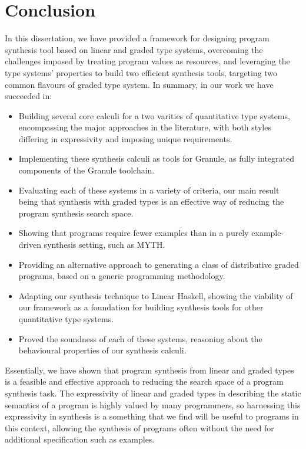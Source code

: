 \chapter{Conclusion}
\label{chapter:conclusion}
In this dissertation, we have provided a framework for designing program
synthesis tool based on linear and graded type systems, overcoming the
challenges imposed by treating program values as resources, and leveraging the
type systems' properties to build two efficient synthesis tools, targeting two
common flavours of graded type system. In summary, in our work we have succeeded
in: 
\begin{itemize}
    \item Building several core calculi for a two varities of quantitative type
          systems, encompassing the major approaches in the literature, with
          both styles differing in expressivity and imposing unique
          requirements. 
    \item Implementing these synthesis calculi as tools for Granule, as fully integrated 
          components of the Granule toolchain. 
    \item Evaluating each of these systems in a variety of criteria, our main
          result being that synthesis with graded types is an effective way of
          reducing the program synthesis search space.  
    \item Showing that programs require fewer examples than in a purely
          example-driven synthesis setting, such as \textsc{MYTH}. 
    \item Providing an alternative approach to generating a class of distributive 
          graded programs, based on a generic programming methodology. 
    \item Adapting our synthesis technique to Linear Haskell, showing the
          viability of our framework as a foundation for building synthesis
          tools for other quantitative type systems. 
    \item Proved the soundness of each of these systems, reasoning about the
          behavioural properties of our synthesis calculi. 
\end{itemize}

Essentially, we have shown that program synthesis from linear and graded types
is a feasible and effective approach to reducing the search space of a program
synthesis task. The expressivity of linear and graded types in describing the
static semantics of a program is highly valued by many programmers, so
harnessing this expressivity in synthesis is a something that we find will be
useful to programs in this context, allowing the synthesis of programs often without
the need for additional specification such as examples.

